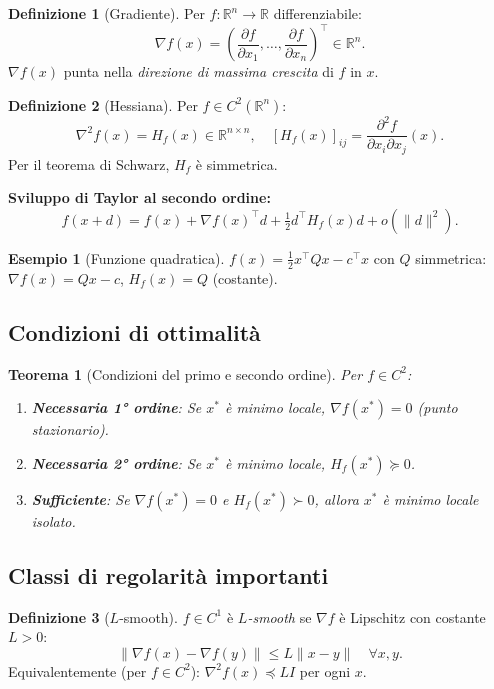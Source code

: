 \documentclass[11pt, a4paper, twoside]{book}
\theoremstyle{definition}
\newtheorem{defn}{Definizione}[chapter]
\newtheorem{example}{Esempio}[chapter]
\theoremstyle{plain}
\newtheorem{thm}{Teorema}[chapter]
\theoremstyle{remark}
\newcommand{\R}{\mathbb{R}}
\begin{document}
\begin{defn}[Gradiente]
Per $f: \R^n \to \R$ differenziabile:
\[
  \nabla f(x) = \left(\frac{\partial f}{\partial x_1}, \ldots, \frac{\partial f}{\partial x_n}\right)^\top \in \R^n.
\]
$\nabla f(x)$ punta nella \emph{direzione di massima crescita} di $f$ in $x$.
\end{defn}

\begin{defn}[Hessiana]
Per $f \in C^2(\R^n)$:
\[
  \nabla^2 f(x) = H_f(x) \in \R^{n \times n}, \quad [H_f(x)]_{ij} = \frac{\partial^2 f}{\partial x_i \partial x_j}(x).
\]
Per il teorema di Schwarz, $H_f$ è simmetrica.
\end{defn}

\textbf{Sviluppo di Taylor al secondo ordine:}
\[
  f(x+d) = f(x) + \nabla f(x)^\top d + \tfrac{1}{2} d^\top H_f(x) d + o(\|d\|^2).
\]

\begin{example}[Funzione quadratica]
$f(x) = \frac{1}{2}x^\top Q x - c^\top x$ con $Q$ simmetrica: $\nabla f(x) = Qx - c$, $H_f(x) = Q$ (costante).
\end{example}

\subsection{Condizioni di ottimalità}

\begin{thm}[Condizioni del primo e secondo ordine]
Per $f \in C^2$:
\begin{enumerate}
  \item \textbf{Necessaria 1° ordine}: Se $x^*$ è minimo locale, $\nabla f(x^*) = 0$ (punto stazionario).
  \item \textbf{Necessaria 2° ordine}: Se $x^*$ è minimo locale, $H_f(x^*) \succeq 0$.
  \item \textbf{Sufficiente}: Se $\nabla f(x^*) = 0$ e $H_f(x^*) \succ 0$, allora $x^*$ è minimo locale isolato.
\end{enumerate}
\end{thm}

\subsection{Classi di regolarità importanti}
\label{sec:classi-regularita}

\begin{defn}[$L$-smooth]
$f \in C^1$ è \emph{$L$-smooth} se $\nabla f$ è Lipschitz con costante $L > 0$:
\[
  \|\nabla f(x) - \nabla f(y)\| \leq L\|x - y\| \quad \forall x, y.
\]
Equivalentemente (per $f \in C^2$): $\nabla^2 f(x) \preceq LI$ per ogni $x$.
\end{defn}
\end{document}
